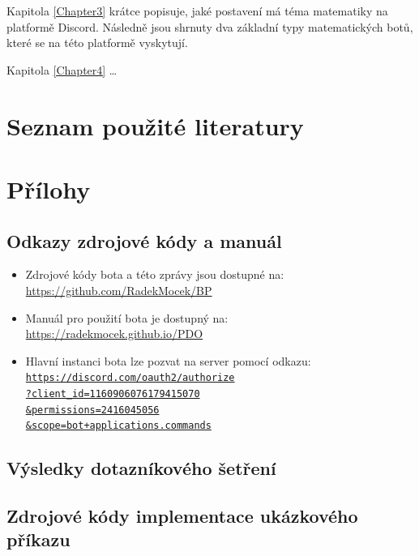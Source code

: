 \documentclass[FM]{tulthesis}
\begin{document}
	Kapitola \ref{Chapter3} krátce popisuje, jaké postavení má téma matematiky na platformě Discord. Následně jsou shrnuty dva základní typy matematických botů, které se na této platformě vyskytují.
	
	Kapitola \ref{Chapter4} \dots
	\fi

	\chapter*{Seznam použité literatury}
	\printbibliography[heading=none]
	
	\appendix
	\chapter{Přílohy}
	
	\section{Odkazy zdrojové kódy a manuál}
	
	\begin{itemize}
		\item Zdrojové kódy bota a této zprávy jsou dostupné na: \\\url{https://github.com/RadekMocek/BP}%
		\item Manuál pro použití bota je dostupný na: \\\url{https://radekmocek.github.io/PDO}%
		\item Hlavní instanci bota lze pozvat na server pomocí odkazu: \\ \href{https://discord.com/oauth2/authorize?client_id=1160906076179415070&permissions=2416045056&scope=bot+applications.commands}{\texttt{https://discord.com/oauth2/authorize\\?client\_id=1160906076179415070\\\&permissions=2416045056\\\&scope=bot+applications.commands}}%
	\end{itemize}
	
	\section{Výsledky dotazníkového šetření}
	
	\section{Zdrojové kódy implementace ukázkového příkazu}\label{Appendix3}
	
\end{document}
